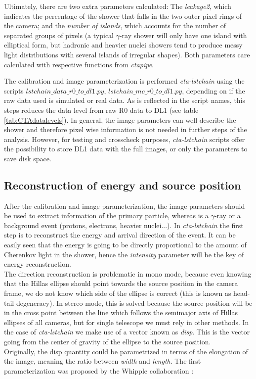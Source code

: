 \documentclass[main.tex]{subfiles}
\begin{document}
Ultimately, there are two extra parameters calculated: The \textit{leakage2}, which indicates the percentage of the shower that falls in the two outer pixel rings of the camera; and the \textit{number of islands}, which accounts for the number of separated groups of pixels (a typical $\gamma$-ray shower will only have one island with elliptical form, but hadronic and heavier nuclei showers tend to produce messy light distributions with several islands of irregular shapes). Both parameters care calculated with respective functions from \textit{ctapipe}.

The calibration and image parameterization is performed \textit{cta-lstchain} using the scripts \textit{$lstchain\_data\_r0\_to\_dl1.py$}, \textit{$lstchain\_mc\_r0\_to\_dl1.py$}, depending on if the raw data used is simulated or real data. As is reflected in the script names, this steps reduces the data level from raw R0 data to DL1 (see table \ref{tab:CTAdatalevels}). In general, the image parameters can well describe the shower and therefore pixel wise information is not needed in further steps of the analysis. However, for testing and crosscheck purposes, \textit{cta-lstchain} scripts offer the possibility to store DL1 data with the full images, or only the parameters to save disk space.


\subsection{Reconstruction of energy and source position}

After the calibration and image parameterization, the image parameters should be used to extract information of the primary particle, whereas is a $\gamma$-ray or a background event (protons, electrons, heavier nuclei...). In \textit{cta-lstchain} the first step is to reconstruct the energy and arrival direction of the event. It can be easily seen that the energy is going to be directly proportional to the amount of Cherenkov light in the shower, hence the \textit{intensity} parameter will be the key of energy reconstruction.\\
The direction reconstruction is problematic in mono mode, because even knowing that the Hillas ellipse should point towards the source position in the camera frame, we do not know which side of the ellipse is correct (this is known as head-tail degeneracy). In stereo mode, this is solved because the source position will be in the cross point between the line which follows the semimajor axis of Hillas ellipses of all cameras, but for single telescope we must rely in other methods. In the case of \textit{cta-lstchain} we make use of a vector known as \textit{disp}. This is the vector going from the center of gravity of the ellipse to the source position.\\
Originally, the disp quantity could be parametrized in terms of the elongation of the image, meaning the ratio between \textit{width} and \textit{length}. The first parameterization was proposed by the Whipple collaboration \cite{1994dispwhipple}:
\end{document}
